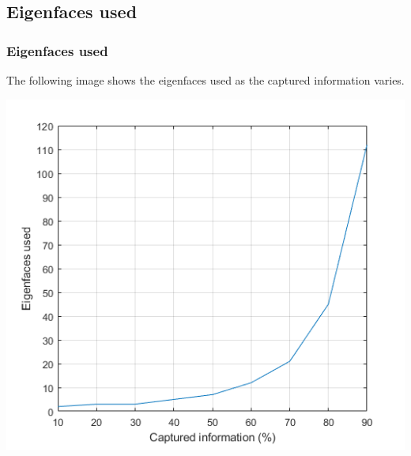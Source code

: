 \documentclass[10pt]{beamer}
\begin{document}
\subsection{Eigenfaces used}
\begin{frame}
    \frametitle{Eigenfaces used}
    The following image shows the eigenfaces used as the captured information varies.

    \begin{center}
        \includegraphics[scale=0.6]{eigenfaces_used}    
    \end{center}
    
\end{frame}
\end{document}
